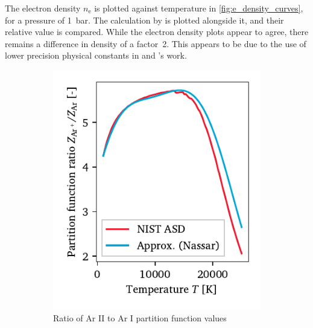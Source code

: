         The electron density $n_\mathrm{e}$ is plotted against temperature in \autoref{fig:e_density_curves}, for a pressure of \qty{1}{bar}. The calculation by \citeauthor{nassarInvestigationLasersustainedPlasma2012} is plotted alongside it, and their relative value is compared. While the electron density plots appear to agree, there remains a difference in density of a factor~2. This appears to be due to the use of lower precision physical constants in \citeauthor{akarapuNumericalModelLasersustained2009} and \citeauthor{nassarInvestigationLasersustainedPlasma2012}'s work.

        \begin{figure}[h]
            \centering
            \begin{subfigure}[t]{2.6in}
                \centering
                \includegraphics[]{assets/4 models/partition}
                \caption{Ratio of Ar II to Ar I partition function values}
                \label{fig:e_density_partition}
            \end{subfigure}
            \hfill
            \begin{subfigure}[t]{3.2in}
                \centering

\end{subfigure}
\end{figure}

